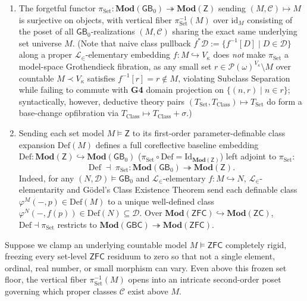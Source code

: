 \begin{definition}
\begin{enumerate}
  \item The forgetful functor $\pi_{\mathrm{Set}} : \mathbf{Mod}(\mathsf{GB}_0) \twoheadrightarrow \mathbf{Mod}(\mathsf{Z})$ sending $(M, \mathcal{C}) \mapsto M$ is surjective on objects, with vertical fiber $\pi_{\mathrm{Set}}^{-1}(M)$ over $\mathrm{id}_M$ consisting of the poset of all $\mathsf{GB}_0$-realizations $(M, \mathcal{C})$ sharing the exact same underlying set universe $M$. (Note that naive class pullback $f^*\mathcal{D} := \{f^{-1}[D] \mid D \in \mathcal{D}\}$ along a proper $\mathcal{L}_\in$-elementary embedding $f : M \hookrightarrow V_\kappa$ does \emph{not} make $\pi_{\mathrm{Set}}$ a model-space Grothendieck fibration, as any small set $r \in \mathcal{P}(\omega)^{V_\kappa} \setminus M$ over countable $M \prec V_\kappa$ satisfies $f^{-1}[r] = r \notin M$, violating Subclass Separation while failing to commute with \textbf{G4} domain projection on $\{(n, r) \mid n \in r\}$; syntactically, however, deductive theory pairs $(T_{\mathrm{Set}}, T_{\mathrm{Class}}) \mapsto T_{\mathrm{Set}}$ do form a base-change opfibration via $T_{\mathrm{Class}} \mapsto T_{\mathrm{Class}} + \sigma$.)
  \item Sending each set model $M \models \mathsf{Z}$ to its first-order parameter-definable class expansion $\mathrm{Def}(M)$ defines a full coreflective baseline embedding $\mathrm{Def} : \mathbf{Mod}(\mathsf{Z}) \hookrightarrow \mathbf{Mod}(\mathsf{GB}_0)$ ($\pi_{\mathrm{Set}} \circ \mathrm{Def} = \mathrm{Id}_{\mathbf{Mod}(\mathsf{Z})}$) left adjoint to $\pi_{\mathrm{Set}}$:
  \[
    \mathrm{Def} \;\dashv\; \pi_{\mathrm{Set}} : \mathbf{Mod}(\mathsf{GB}_0) \twoheadrightarrow \mathbf{Mod}(\mathsf{Z}).
  \]
  Indeed, for any $(N, \mathcal{D}) \models \mathsf{GB}_0$ and $\mathcal{L}_\in$-elementary $f : M \hookrightarrow N$, $\mathcal{L}_\in$-elementarity and G\"odel's Class Existence Theorem send each definable class $\varphi^M(-, p) \in \mathrm{Def}(M)$ to a unique well-defined class $\varphi^N(-, f(p)) \in \mathrm{Def}(N) \subseteq \mathcal{D}$. Over $\mathbf{Mod}(\mathsf{ZFC}) \hookrightarrow \mathbf{Mod}(\mathsf{ZC})$, $\mathrm{Def} \dashv \pi_{\mathrm{Set}}$ restricts to $\mathbf{Mod}(\mathsf{GBC}) \twoheadrightarrow \mathbf{Mod}(\mathsf{ZFC})$.
\end{enumerate}
\end{definition}

Suppose we clamp an underlying countable model $M \models \mathsf{ZFC}$ completely rigid, freezing every set-level $\mathsf{ZFC}$ residuum to zero so that not a single element, ordinal, real number, or small morphism can vary. Even above this frozen set floor, the vertical fiber $\pi_{\mathrm{Set}}^{-1}(M)$ opens into an intricate second-order poset governing which proper classes $\mathcal{C}$ exist above $M$.

